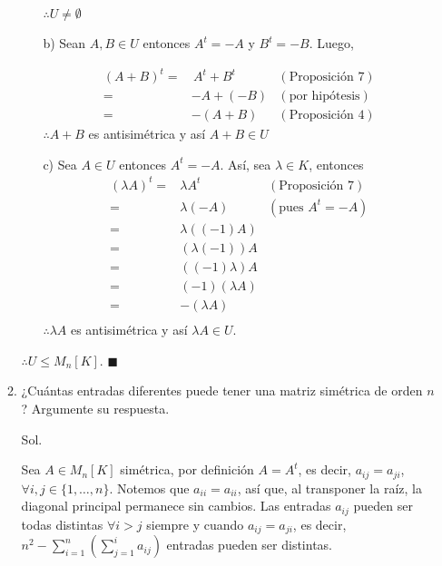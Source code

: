 \documentclass[fleqn]{article}
\begin{document}
\begin{enumerate}
\begin{enumerate}
\begin{enumerate}
                $ \therefore U \neq \emptyset $

                \item[b)] Sean $ A, B \in U $ entonces $ A^t = -A $ y $ B^t = -B $. Luego, \par
                \begin{align*}
                    (A + B)^t =& \, A^t + B^t & (\text{Proposición 7}) \\
                    =& -A + (-B) & (\text{por hipótesis}) \\
                    =& -(A + B) & (\text{Proposición 4})
                \end{align*}
                $ \therefore A + B $ es antisimétrica y así $ A + B \in U $

                \item[c)] Sea $ A \in U $ entonces $ A^t = -A $. Así, sea $ \lambda \in K $, entonces
                \begin{align*}
                    (\lambda A)^t =& \lambda A^t & (\text{Proposición 7}) \\
                    =& \lambda (-A) & (\text{pues } A^t = -A) \\
                    =& \lambda ((-1)A) \\
                    =& (\lambda (-1)) A \\
                    =& ((-1) \lambda) A \\
                    =& (-1) ( \lambda A) \\
                    =& - ( \lambda A) \\
                \end{align*}
                $ \therefore \lambda A $ es antisimétrica y así $ \lambda A \in U $.
            \end{enumerate}
            $ \therefore U \leq M_n[K] $. $ \blacksquare $
            
            \item ¿Cuántas entradas diferentes puede tener una matriz simétrica de orden $ n $? Argumente su respuesta. \par
            
            \hspace{2.7mm}  Sol. \par

            Sea $ A \in M_n[K] $ simétrica, por definición $ A = A^t $, es decir, $ a_{ij} = a_{ji} $, $ \forall i, j \in \{1, \ldots, n\} $. Notemos que $ a_{ii} = a_{ii} $, así que, al transponer la raíz, la diagonal principal permanece sin cambios. Las entradas $ a_{ij} $ pueden ser todas distintas $ \forall i > j $ siempre y cuando $ a_{ij} = a_{ji} $, es decir, $ n^2 - \displaystyle \sum_{i=1}^{n} \left(\sum_{j=1}^{i} a_{ij} \right) $ entradas pueden ser distintas.
        \end{enumerate}


\end{enumerate}
\end{document}
